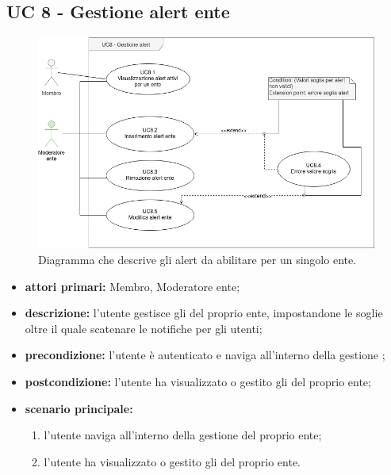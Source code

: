 	\subsection{UC 8 - Gestione alert ente}
		
		\begin{figure}[H]
			\centering
			\includegraphics[scale=0.60]{res/images/uc8}
			\caption{Diagramma che descrive gli alert da abilitare per un singolo ente.}
		\end{figure}

		\begin{itemize}
			\item \textbf{attori primari:} Membro, Moderatore ente;
			\item \textbf{descrizione:} l'utente gestisce gli  del proprio ente, impostandone le soglie oltre il quale scatenare le notifiche per gli utenti;
			\item \textbf{precondizione:} l'utente è autenticato e naviga all'interno della gestione ;
			\item \textbf{postcondizione:} l'utente ha visualizzato o gestito gli  del proprio ente;
			\item \textbf{scenario principale:}
			\begin{enumerate}
				\item{l'utente naviga all'interno della gestione  del proprio ente;}
				\item{l'utente ha visualizzato o gestito gli  del proprio ente.}
			\end{enumerate}	
		\end{itemize}
			

